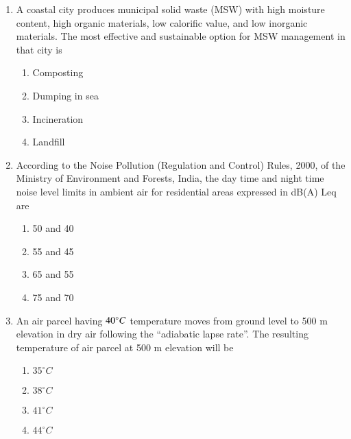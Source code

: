 \documentclass[journal]{IEEEtran}
\begin{document}
\begin{enumerate}
    \item A coastal city produces municipal solid waste (MSW) with high moisture
    content, high organic materials, low calorific value, and low inorganic materials.
    The most effective and sustainable option for MSW management in that city is  

        \begin{multicols}{4}
            \begin{enumerate}
                \item Composting
                \item Dumping in sea
                \item Incineration
                \item Landfill
            \end{enumerate}
        \end{multicols}

    \item According to the Noise Pollution (Regulation and Control) Rules, 2000,
    of the Ministry of Environment and Forests, India, the day time and night time
    noise level limits in ambient air for residential areas expressed in dB(A) Leq are
        \begin{multicols}{4}
            \begin{enumerate}
                \item 50 and 40
                \item 55 and 45
                \item 65 and 55
                \item 75 and 70
            \end{enumerate}
        \end{multicols}

        \item An air parcel having $40\degree C$ temperature moves from ground level to
        500 m elevation in dry air following the ``adiabatic lapse rate''. The resulting  
        temperature of air parcel at 500 m elevation will be
        \begin{multicols}{4}
            \begin{enumerate}
                \item $35^{\circ}C$
                \item $38^{\circ}C$
                \item $41^{\circ}C$
                \item $44^{\circ}C$
            \end{enumerate}
        \end{multicols}


\end{enumerate}
\end{document}
